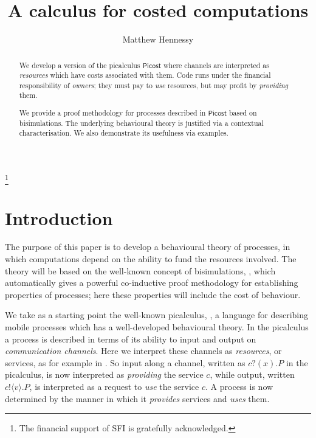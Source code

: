 \documentclass{LMCS}
\newcommand{\pfn}[1]{\mathsf{#1}}  \newcommand{\cfn}[1]{\mathsf{#1}}  \newcommand{\ownfnt}[1]{{\mathsf{#1}}}
\newcommand{\picost}{\ensuremath{\pfn{Picost}}\xspace}
\newcommand{\pa}[1]{\!\left(#1\right)}
\newcommand{\pc}[1]{\langle#1\rangle}
\begin{document}
\title[costed computations]{A calculus for costed computations}

\author[M.~Hennessey]{Matthew Hennessy}


\address{Department of Computer Science\\ Trinity College Dublin\\
    Ireland} 

\thanks{The financial support of SFI is gratefully acknowledged.}







\begin{abstract}

We develop a version of the picalculus \picost where  
channels are interpreted as \emph{resources} which have 
costs associated with them. Code runs under the financial
responsibility of \emph{owners}; they   must pay to 
\emph{use} resources, but may profit by \emph{providing} 
them.

We provide a  proof methodology for processes described in \picost
based on bisimulations. The underlying  behavioural theory is justified
via a contextual characterisation. We also demonstrate its usefulness
via examples. 

\end{abstract}



\maketitle 


\section{Introduction}


The purpose of this paper is to develop a  behavioural
theory of processes, in which computations depend on the ability to
fund the resources involved. The theory will be based on the
well-known concept of bisimulations, \cite{pimilner}, which
automatically gives a powerful co-inductive proof methodology for
establishing properties of processes; here these properties will
include the cost of behaviour.



 We take as a starting point
the well-known picalculus, \cite{pibook,pimilner}, a language for
describing mobile processes which has a well-developed behavioural
theory. In the picalculus a process is described in terms of its
ability to input and output on \emph{communication channels}. Here we
interpret these channels as \emph{resources}, or services, as for
example in \cite{beppe}. So input along a channel, written as
$c?\pa{x}.P$ in the picalculus, is now interpreted as \emph{providing}
the service $c$, while output, written $c!\pc{v}.P$, is interpreted as
a request to \emph{use} the service $c$.  A process is now determined
by the manner in which it \emph{provides}  services and
\emph{uses} them.
   
\end{document}
